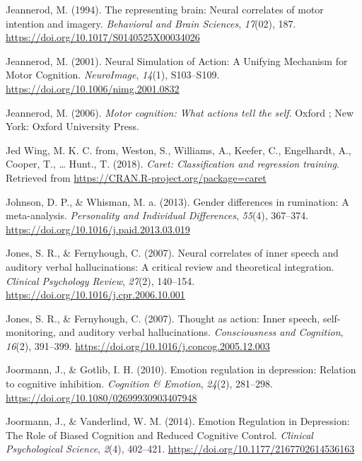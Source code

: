 \documentclass[a4paper,12pt,twoside,openright,oldfontcommands,final]{memoir}
\begin{document}
\leavevmode\hypertarget{ref-jeannerod_representing_1994}{}%
Jeannerod, M. (1994). The representing brain: Neural correlates of motor intention and imagery. \emph{Behavioral and Brain Sciences}, \emph{17}(02), 187. \url{https://doi.org/10.1017/S0140525X00034026}

\leavevmode\hypertarget{ref-jeannerod_neural_2001}{}%
Jeannerod, M. (2001). Neural Simulation of Action: A Unifying Mechanism for Motor Cognition. \emph{NeuroImage}, \emph{14}(1), S103--S109. \url{https://doi.org/10.1006/nimg.2001.0832}

\leavevmode\hypertarget{ref-jeannerod_motor_2006}{}%
Jeannerod, M. (2006). \emph{Motor cognition: What actions tell the self}. Oxford ; New York: Oxford University Press.

\leavevmode\hypertarget{ref-R-caret}{}%
Jed Wing, M. K. C. from, Weston, S., Williams, A., Keefer, C., Engelhardt, A., Cooper, T., \ldots{} Hunt., T. (2018). \emph{Caret: Classification and regression training}. Retrieved from \url{https://CRAN.R-project.org/package=caret}

\leavevmode\hypertarget{ref-Johnson2013}{}%
Johnson, D. P., \& Whisman, M. a. (2013). Gender differences in rumination: A meta-analysis. \emph{Personality and Individual Differences}, \emph{55}(4), 367--374. \url{https://doi.org/10.1016/j.paid.2013.03.019}

\leavevmode\hypertarget{ref-jones_neural_2007}{}%
Jones, S. R., \& Fernyhough, C. (2007). Neural correlates of inner speech and auditory verbal hallucinations: A critical review and theoretical integration. \emph{Clinical Psychology Review}, \emph{27}(2), 140--154. \url{https://doi.org/10.1016/j.cpr.2006.10.001}

\leavevmode\hypertarget{ref-Jones2007}{}%
Jones, S. R., \& Fernyhough, C. (2007). Thought as action: Inner speech, self-monitoring, and auditory verbal hallucinations. \emph{Consciousness and Cognition}, \emph{16}(2), 391--399. \url{https://doi.org/10.1016/j.concog.2005.12.003}

\leavevmode\hypertarget{ref-joormann_emotion_2010}{}%
Joormann, J., \& Gotlib, I. H. (2010). Emotion regulation in depression: Relation to cognitive inhibition. \emph{Cognition \& Emotion}, \emph{24}(2), 281--298. \url{https://doi.org/10.1080/02699930903407948}

\leavevmode\hypertarget{ref-joormann_emotion_2014}{}%
Joormann, J., \& Vanderlind, W. M. (2014). Emotion Regulation in Depression: The Role of Biased Cognition and Reduced Cognitive Control. \emph{Clinical Psychological Science}, \emph{2}(4), 402--421. \url{https://doi.org/10.1177/2167702614536163}
\end{document}
